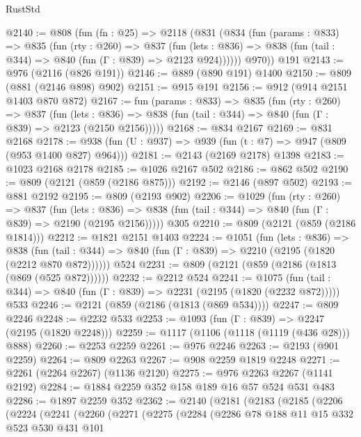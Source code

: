 \begin{lexlean}{RustStd}
\begin{coremodule}
@2140 := @808
    (fun (fn : @25) =>
    @2118
      (@831
        (@834
          (fun (params : @833) =>
          @835
            (fun (rty : @260) =>
            @837
              (fun (lets : @836) =>
              @838 (fun (tail : @344) => @840 (fun (Γ : @839) => @2123 @924))))))
        @970))
    @191
@2143 := @976 (@2116 (@826 @191))
@2146 := @889 (@890 @191) @1400
@2150 := @809 (@881 (@2146 @898) @902)
@2151 := @915 @191
@2156 := @912 (@914 @2151 @1403 @870 @872)
@2167 := fun (params : @833) =>
  @835
    (fun (rty : @260) =>
    @837
      (fun (lets : @836) =>
      @838 (fun (tail : @344) => @840 (fun (Γ : @839) => @2123 (@2150 @2156)))))
@2168 := @834 @2167
@2169 := @831 @2168
@2178 := @938 (fun (U : @937) => @939 (fun (t : @7) => @947 (@809 (@953 @1400 @827) @964)))
@2181 := @2143 (@2169 @2178) @1398
@2183 := @1023 @2168 @2178
@2185 := @1026 @2167 @502
@2186 := @862 @502
@2190 := @809 (@2121 (@859 (@2186 @875)))
@2192 := @2146 (@897 @502)
@2193 := @881 @2192
@2195 := @809 (@2193 @902)
@2206 := @1029
    (fun (rty : @260) =>
    @837
      (fun (lets : @836) =>
      @838 (fun (tail : @344) => @840 (fun (Γ : @839) => @2190 (@2195 @2156)))))
    @305
@2210 := @809 (@2121 (@859 (@2186 @1814)))
@2212 := @1821 @2151 @1403
@2224 := @1051
    (fun (lets : @836) =>
    @838 (fun (tail : @344) => @840 (fun (Γ : @839) => @2210 (@2195 (@1820 (@2212 @870 @872))))))
    @524
@2231 := @809 (@2121 (@859 (@2186 (@1813 (@869 (@525 @872))))))
@2232 := @2212 @524
@2241 := @1075
    (fun (tail : @344) => @840 (fun (Γ : @839) => @2231 (@2195 (@1820 (@2232 @872)))))
    @533
@2246 := @2121 (@859 (@2186 (@1813 (@869 @534))))
@2247 := @809 @2246
@2248 := @2232 @533
@2253 := @1093 (fun (Γ : @839) => @2247 (@2195 (@1820 @2248)))
@2259 := @1117 (@1106 (@1118 (@1119 (@436 @28))) @888)
@2260 := @2253 @2259
@2261 := @976 @2246
@2263 := @2193 (@901 @2259)
@2264 := @809 @2263
@2267 := @908 @2259 @1819 @2248
@2271 := @2261 (@2264 @2267) (@1136 @2120)
@2275 := @976 @2263 @2267 (@1141 @2192)
@2284 := @1884 @2259 @352 @158 @189 @16 @57 @524 @531 @483
@2286 := @1897 @2259 @352
@2362 := @2140
    (@2181
      (@2183
        (@2185
          (@2206
            (@2224
              (@2241
                (@2260
                  (@2271
                    (@2275
                      (@2284
                        (@2286
                          @78
                          @188
                          @11
                          @15
                          @332
                          @523
                          @530
                          @431
                          @101

\end{coremodule}
\end{lexlean}
